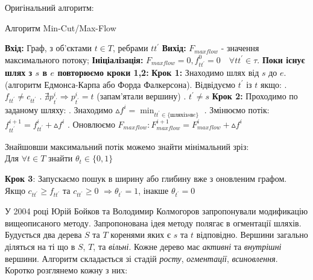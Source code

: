 Оригінальний алгоритм:

\begin{algorithm}[H]
    \caption{Алгоритм Min-Cut/Max-Flow}
    \begin{algorithmic}
        \State \textbf{Вхід:} Граф, з об'єктами $ t \in T $, ребрами $tt^{'} $
        \State \textbf{Вихід:} $ F_{maxflow} $ - значення максимального потоку;
        \State \textbf{Ініціалізація:} $ F_{maxflow} = 0, f_{tt^{'}}^{0} = 0 \quad \forall tt^{'}  \in \tau $.
        \State \textbf{Поки існує шлях з $s$ в $e$ повторюємо кроки 1,2:}
        \State \textbf{Крок 1:} Знаходимо шлях від $s$ до $e$. (алгоритм Едмонса-Карпа або Форда Фалкерсона).
        \State Відвідуємо $ t^{'}$ із $t $ якщо:
        \State {}. $ f_{tt^{'}} \neq c_{tt^{'}} $
        \State {}. $ \nexists p_{t^{'}}^{i} \Rightarrow p_{t^{'}}^{i} = t $ (запам'ятали вершину)
        \State {}. $ t^{'} \neq s $
        \State \textbf{Крок 2:} Проходимо по заданому шляху:
        \State {}. Знаходимо $ \vartriangle f^{i} = \min_{tt^{'} \in \{шлях із s в e \}} $
        \State {}. Змінюємо потік: $ f_{tt^{'}}^{i+1} = f_{tt^{'}}^{i} + \vartriangle f^{i} $
        \State {}. Оновлюємо $ F_{maxflow}: F_{maxflow}^{i+1} = F_{maxflow}^{i} + \vartriangle f^{i} $
    \end{algorithmic}

    Знайшовши максимальний потік можемо знайти мінімальний зріз: \\
    Для $\forall t \in T$ знайти $\theta_{t} \in \{0,1\}$
    \begin{algorithmic}
        \State \textbf{Крок 3}: Запускаємо пошук в ширину або глибину вже з оновленим графом.
        \State \qquad Якщо $c_{tt^{'}} \geqslant f_{tt^{'}}$ та $c_{tt^{'}} \geqslant 0$
        $\Rightarrow \theta_{t^{'}} = 1 $, інакше $\theta_{t^{'}} = 0 $
    \end{algorithmic}
\end{algorithm}

У 2004 році Юрій Бойков та Володимир Колмогоров запропонували модификацію вищеописаного
методу.
Запропонована ідея методу полягає в огментації шляхів. Будується два дерева $S$ та $T$
коренями яких є $s$ та $t$ відповідно. Вершини загально діляться на ті що в $S$, $T$, та
\textit{вільні}. Кожне дерево має \textit{активні} та \textit{внутрішні} вершини.
Алгоритм складається зі стадій \textit{росту}, \textit{огментації}, \textit{всиновлення}.\\
Коротко розглянемо кожну з них:

